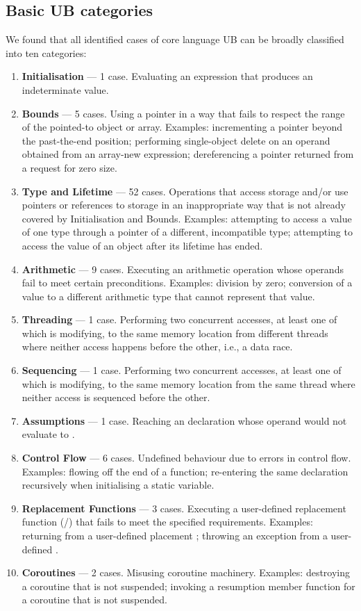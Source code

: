 \subsection{Basic UB categories}
\label{categories}

We found that all identified cases of core language UB can be broadly classified into ten categories:
 \renewcommand{\labelenumi}{\Roman{enumi}.}
\begin{enumerate}
\item \textbf{Initialisation} --- 1 case. Evaluating an expression that produces an indeterminate value.
\item \textbf{Bounds} --- 5 cases. Using a pointer in a way that fails to respect the range of the pointed-to object or array. Examples: incrementing a pointer beyond the past-the-end position; performing single-object delete on an operand obtained from an array-new expression;  dereferencing a pointer returned from a request for zero size.
\item \textbf{Type and Lifetime} --- 52 cases. Operations that access storage and/or use pointers or references to storage in an inappropriate way that is not already covered by Initialisation and Bounds. Examples: attempting to access a value of one type through  a pointer of a different, incompatible type; attempting to access the value of an object after its lifetime has ended. 
\item \textbf{Arithmetic} --- 9 cases. Executing an arithmetic operation whose operands fail to meet certain preconditions. Examples: division by zero; conversion of a value to a different arithmetic type that cannot represent that value. 
\item \textbf{Threading} --- 1 case. Performing two concurrent accesses, at least one of which is modifying, to the same memory location from different threads where neither access happens before the other, i.e., a data race.
\item \textbf{Sequencing} --- 1 case. Performing two concurrent accesses, at least one of which is modifying, to the same memory location from the same thread where neither access is sequenced before the other.
\item \textbf{Assumptions} --- 1 case. Reaching an \tcode{[[assume]]} declaration whose operand would not evaluate to .
\item \textbf{Control Flow} --- 6 cases. Undefined behaviour due to errors in control flow. Examples: flowing off the end of a function; re-entering the same declaration recursively when initialising a static variable.
\item \textbf{Replacement Functions} --- 3 cases. Executing a user-defined replacement function (/) that fails to meet the specified requirements. Examples: returning  from a user-defined placement ; throwing an exception from a user-defined .
\item \textbf{Coroutines} --- 2 cases. Misusing coroutine machinery. Examples: destroying a coroutine that is not suspended; invoking a resumption member function for a coroutine that is not suspended.
\end{enumerate}

